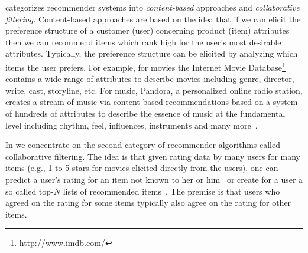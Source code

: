 \documentclass[nojss]{jss}
\begin{document}
\cite{recommender:Ansari:2000} categorizes recommender systems into
\emph{content-based} approaches and \emph{collaborative filtering.}
Content-based approaches are based on the idea that
if we can elicit the preference structure of a customer (user)
concerning product (item) attributes then we can recommend items
which rank high for the user's most desirable attributes.
Typically, the preference structure can be elicited by analyzing which
items the user prefers. For example, for movies the Internet Movie
Database\footnote{\url{http://www.imdb.com/}}
contains a wide range of attributes to describe movies including
genre, director, write, cast, storyline, etc. For music, Pandora,
a personalized online radio station,
creates a stream of music via content-based recommendations
based on a system of hundreds of attributes
to describe the essence of music at the
fundamental level including
rhythm, feel, influences, instruments and many
more~\citep{recommender:Joyce:2006}.

In  we concentrate on the second category of recommender
algorithms called collaborative filtering.
The idea is that given rating data by many users for many items
(e.g., 1 to 5 stars for movies elicited directly from the users),
one can predict a user's rating for an item
not known to her or him~\citep[see, e.g.,][]{recommender:Goldberg:1992}
or create
for a user a so called top-$N$ lists of recommended
items~\citep[see, e.g.,][]{recommender:Deshpande:2004}.
The premise is that users who agreed on the rating for some items
typically also agree on the rating for other items.
\end{document}
